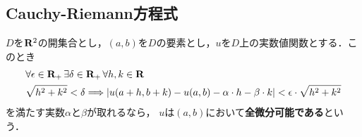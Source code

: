 \subsection{Cauchy-Riemann方程式}
	\begin{screen}
		\begin{dfn}[全微分]\label{def:totally_differentiability}
			$D$を$\mathbf{R}^2$の開集合とし，$(a,b)$を$D$の要素とし，$u$を$D$上の実数値関数とする．このとき
			\begin{align}
				&\forall \epsilon \in \mathbf{R}_+\, \exists \delta \in \mathbf{R}_+\, \forall h,k \in \mathbf{R}\, \\
				&\sqrt{h^2 + k^2} < \delta \Longrightarrow
				\left|u(a+h,b+k) - u(a,b) - \alpha \cdot h - \beta \cdot k\right| 
				< \epsilon \cdot \sqrt{h^2 + k^2}
				\label{fom:def_totally_differentiability}
			\end{align}
			を満たす実数$\alpha$と$\beta$が取れるなら，
			$u$は$(a,b)$において{\bf 全微分可能である}という．
		\end{dfn}
	\end{screen}
	
